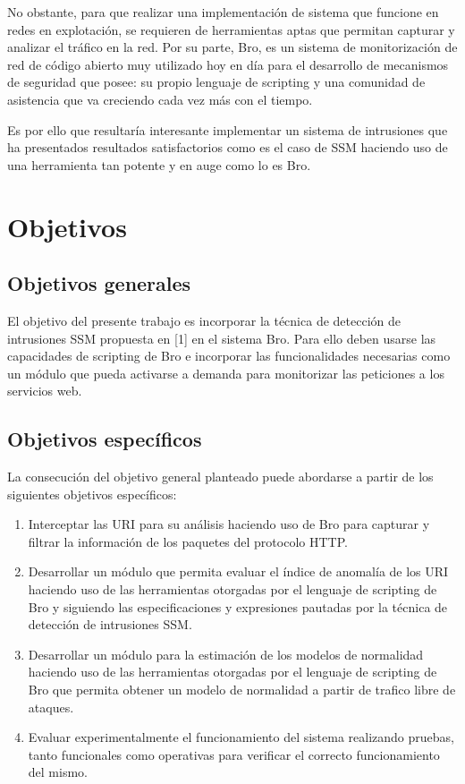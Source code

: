 No obstante, para que realizar una implementación de sistema que funcione en redes en explotación, se requieren de herramientas aptas que permitan capturar y analizar el tráfico en la red. Por su parte, Bro, es un sistema de monitorización de red de código abierto muy utilizado hoy en día para el desarrollo de mecanismos de seguridad que posee: su propio lenguaje de scripting y una comunidad de asistencia que va creciendo cada vez más con el tiempo.

Es por ello que resultaría interesante implementar un sistema de intrusiones que ha presentados resultados satisfactorios como es el caso de SSM haciendo uso de una herramienta tan potente y en auge como lo es Bro.


\section{Objetivos}
\subsection{Objetivos generales}
El objetivo del presente trabajo es incorporar la técnica de detección de intrusiones SSM propuesta en [1] en el sistema Bro. Para ello deben usarse las capacidades de scripting de Bro e incorporar las funcionalidades necesarias como un módulo que pueda activarse a demanda para monitorizar las peticiones a los servicios web.
\subsection{Objetivos específicos}
La consecución del objetivo general planteado puede abordarse a partir de los siguientes objetivos específicos:

\begin{enumerate}
\item Interceptar las URI para su análisis haciendo uso de Bro para capturar y filtrar la información de los paquetes del protocolo HTTP.
\item Desarrollar un módulo que permita evaluar el índice de anomalía de los URI haciendo uso de las herramientas otorgadas por el lenguaje de scripting de Bro y siguiendo las especificaciones y expresiones pautadas por la técnica de detección de intrusiones SSM. 
\item Desarrollar un módulo para la estimación de los modelos de normalidad haciendo uso de las herramientas otorgadas por el lenguaje de scripting de Bro que permita obtener un modelo de normalidad a partir de trafico libre de ataques.
\item Evaluar experimentalmente el funcionamiento del sistema realizando pruebas, tanto funcionales como operativas para verificar el correcto funcionamiento del mismo.
\end{enumerate}

